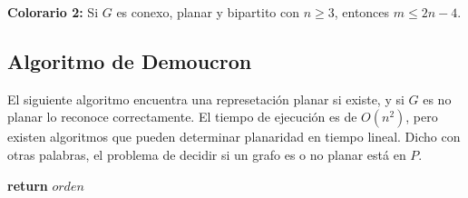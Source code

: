 \begin{badidea}
\textbf{Colorario 2:} Si $G$ es conexo, planar y bipartito con $n \geq 3$, entonces $m \leq 2n - 4$.
\end{badidea}

\subsection{Algoritmo de Demoucron}

El siguiente algoritmo encuentra una represetaci\'on planar si existe, y si $G$ es no planar lo reconoce correctamente. El tiempo de ejecuci\'on es de $O(n^2)$, pero existen algoritmos que pueden determinar planaridad en tiempo lineal. Dicho con otras palabras, el problema de decidir si un grafo es o no planar est\'a en $P$.

\begin{algorithm}
\begin{algorithmic}[1]
  \State \textbf{return} $orden$
\EndFunction
\end{algorithmic}
\end{algorithm}